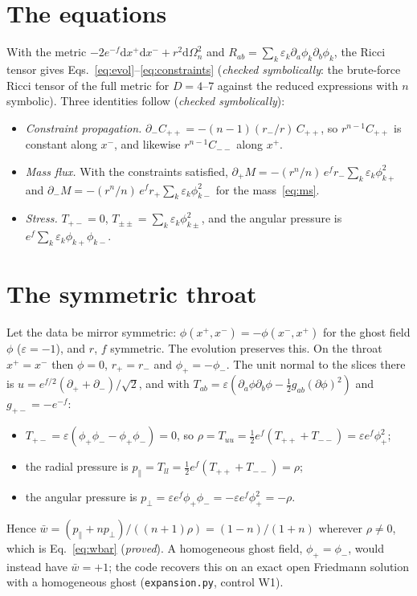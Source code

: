 \documentclass[11pt]{article}
\newcommand{\dd}{\mathrm{d}}
\begin{document}
\clearpage
\appendix

\section{The equations}\label{app:equations}

With the metric $-2e^{-f}\dd x^+\dd x^-+r^2\dd\Omega_n^2$ and $R_{ab}=\sum_k\varepsilon_k\partial_a\phi_k\partial_b\phi_k$,
the Ricci tensor gives Eqs.~\eqref{eq:evol}--\eqref{eq:constraints} (\emph{checked symbolically}: the brute-force
Ricci tensor of the full metric for $D=4$--$7$ against the reduced expressions with $n$ symbolic). Three identities
follow (\emph{checked symbolically}):
\begin{itemize}
\item \emph{Constraint propagation.} $\partial_-C_{++}=-(n-1)(r_-/r)\,C_{++}$, so $r^{n-1}C_{++}$ is constant along
$x^-$, and likewise $r^{n-1}C_{--}$ along $x^+$.
\item \emph{Mass flux.} With the constraints satisfied, $\partial_+M=-(r^n/n)\,e^fr_-\sum_k\varepsilon_k\phi_{k+}^2$ and
$\partial_-M=-(r^n/n)\,e^fr_+\sum_k\varepsilon_k\phi_{k-}^2$ for the mass~\eqref{eq:ms}.
\item \emph{Stress.} $T_{+-}=0$, $T_{\pm\pm}=\sum_k\varepsilon_k\phi_{k\pm}^2$, and the angular pressure is
$e^f\sum_k\varepsilon_k\phi_{k+}\phi_{k-}$.
\end{itemize}

\section{The symmetric throat}\label{app:throat}

Let the data be mirror symmetric: $\phi(x^+,x^-)=-\phi(x^-,x^+)$ for the ghost field $\phi$ ($\varepsilon=-1$), and $r$,
$f$ symmetric. The evolution preserves this. On the throat $x^+=x^-$ then $\phi=0$, $r_+=r_-$ and $\phi_+=-\phi_-$. The
unit normal to the slices there is $u=e^{f/2}(\partial_++\partial_-)/\sqrt2$, and with $T_{ab}=\varepsilon(\partial_a
\phi\partial_b\phi-\tfrac12g_{ab}(\partial\phi)^2)$ and $g_{+-}=-e^{-f}$:
\begin{itemize}
\item $T_{+-}=\varepsilon(\phi_+\phi_--\phi_+\phi_-)=0$, so $\rho=T_{uu}=\tfrac12e^f(T_{++}+T_{--})=\varepsilon e^f\phi_+^2$;
\item the radial pressure is $p_\parallel=T_{ll}=\tfrac12e^f(T_{++}+T_{--})=\rho$;
\item the angular pressure is $p_\perp=\varepsilon e^f\phi_+\phi_-=-\varepsilon e^f\phi_+^2=-\rho$.
\end{itemize}
Hence $\bar w=(p_\parallel+np_\perp)/((n+1)\rho)=(1-n)/(1+n)$ wherever $\rho\ne0$, which is Eq.~\eqref{eq:wbar}
(\emph{proved}). A homogeneous ghost field, $\phi_+=\phi_-$, would instead have $\bar w=+1$; the code recovers this on an
exact open Friedmann solution with a homogeneous ghost (\texttt{expansion.py}, control W1).
\end{document}
